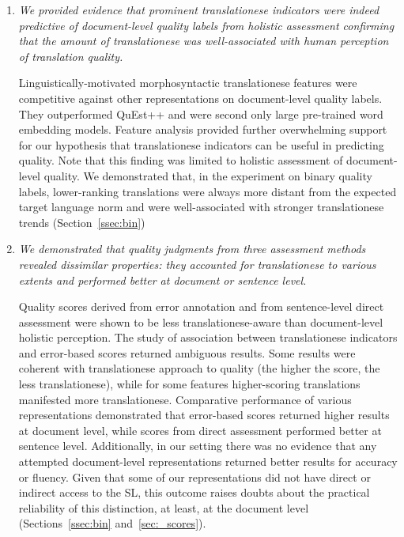 \begin{enumerate}
	\item \textit{We provided evidence that prominent translationese indicators were indeed predictive of document-level quality labels from holistic assessment confirming that the amount of translationese was well-associated with human perception of translation quality.}   
	
	Linguistically-motivated morphosyntactic translationese features were competitive against other representations on document-level quality labels. They outperformed QuEst++ and were second only large pre-trained word embedding models. Feature analysis provided further overwhelming support for our hypothesis that translationese indicators can be useful in predicting quality. Note that this finding was limited to holistic assessment of document-level quality. We demonstrated that, in the experiment on binary quality labels, lower-ranking translations were always more distant from the expected target language norm and were well-associated with stronger translationese trends (Section~\ref{ssec:bin})
	
	\item \textit{We demonstrated that quality judgments from three assessment methods revealed dissimilar properties: they accounted for translationese to various extents and performed better at document or sentence level.} 
	
	Quality scores derived from error annotation and from sentence-level direct assessment were shown to be less translationese-aware than document-level holistic perception. The study of association between translationese indicators and error-based scores returned ambiguous results. Some results were coherent with translationese approach to quality (the higher the score, the less translationese), while for some features higher-scoring translations manifested more translationese.
	Comparative performance of various representations demonstrated that error-based scores returned higher results at document level, while scores from direct assessment performed better at sentence level. %
	Additionally, in our setting there was no evidence that any attempted document-level representations returned better results for accuracy or fluency. Given that some of our representations did not have direct or indirect access to the SL, this outcome raises doubts about the practical reliability of this distinction, at least, at the document level (Sections~\ref{ssec:bin} and~\ref{sec:_scores}). 
	

\end{enumerate}
